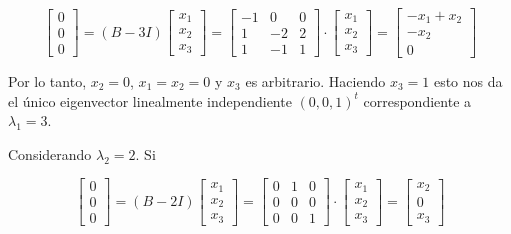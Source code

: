 \documentclass{report}
\numberwithin{subsection}{section} %
\begin{document}
    \begin{equation*}
        \begin{bmatrix}
            0 \\ 0 \\ 0
        \end{bmatrix} = (B - 3I)
        \begin{bmatrix}
            x_1 \\ x_2 \\ x_3
        \end{bmatrix} =
        \begin{bmatrix}
            -1 & 0 & 0 \\
            1 & -2 & 2 \\
            1 & -1 & 1
        \end{bmatrix}  \cdot 
        \begin{bmatrix}
            x_1 \\ x_2 \\ x_3
        \end{bmatrix} =
        \begin{bmatrix}
            -x_1 + x_2 \\ -x_2 \\ 0
        \end{bmatrix}
    \end{equation*}

    Por lo tanto, $x_2 = 0$, $x_1 = x_2 = 0$ y $x_3$ es arbitrario. Haciendo $x_3 = 1$ esto nos da el único eigenvector linealmente independiente $(0, 0, 1)^t$ correspondiente a $λ_1 = 3$.

    Considerando $λ_2 = 2$. Si

    \begin{equation*}
        \begin{bmatrix}
            0 \\ 0 \\ 0
        \end{bmatrix} = (B - 2I)
        \begin{bmatrix}
            x_1 \\ x_2 \\ x_3
        \end{bmatrix} =
        \begin{bmatrix}
            0 & 1 & 0 \\
            0 & 0 & 0 \\
            0 & 0 & 1
        \end{bmatrix}  \cdot 
        \begin{bmatrix}
            x_1 \\ x_2 \\ x_3
        \end{bmatrix} =
        \begin{bmatrix}
            x_2 \\ 0 \\ x_3
        \end{bmatrix}
    \end{equation*}
    
\end{document}
